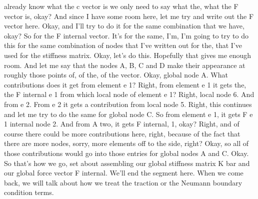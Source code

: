 \documentclass[10pt]{article}
\begin{document}
already know what the c vector is we only need to say what the, what the F vector is, okay? And since I have some room here, let me try and write out the F vector here. Okay, and I'll try to do it for the same combination that we have, okay? So for the F internal vector. It's for the same, I'm, I'm going to try to do this for the same combination of nodes that I've written out for the, that I've used for the stiffness matrix. Okay, let's do this. Hopefully that gives me enough room. And let me say that the nodes A, B, C and D make their appearance at roughly those points of, of the, of the vector. Okay, global node A. What contributions does it get from element e 1? Right, from element e 1 it gets the, the F internal e 1 from which local node of element e 1? Right, local node 6. And from e 2. From e 2 it gets a contribution from local node 5. Right, this continues and let me try to do the same for global node C. So from element e 1, it gets F e 1 internal node 2. And from A two, it gets F internal, 1, okay? Right, and of course there could be more contributions here, right, because of the fact that there are more nodes, sorry, more elements off to the side, right? Okay, so all of those contributions would go into those entries for global nodes A and C. Okay. So that's how we go, set about assembling our global stiffness matrix K bar and our global force vector F internal. We'll end the segment here. When we come back, we will talk about how we treat the traction or the Neumann boundary condition terms.
\end{document}
